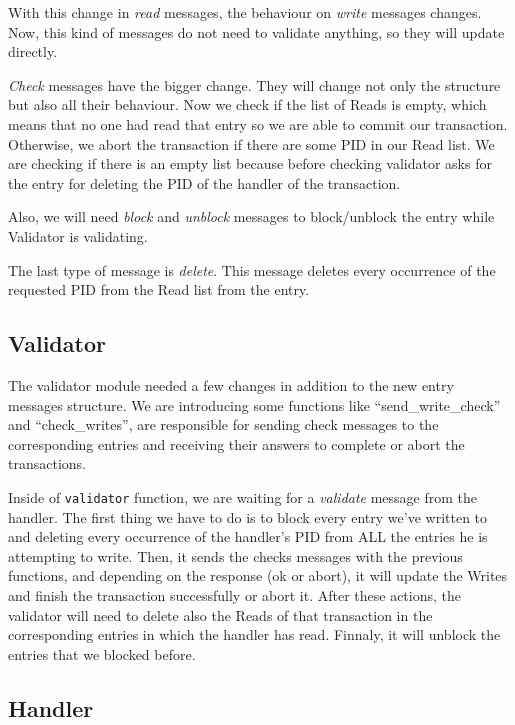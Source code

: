 \documentclass[a4paper, 10pt]{article}
\begin{document}
With this change in \textit{read} messages, the behaviour on \textit{write} messages changes. Now, this kind of messages do not need to validate anything, so they will update directly.

\textit{Check} messages have the bigger change. They will change not only the structure but also all their behaviour. Now we check if the list of Reads is empty, which means that no one had read that entry so we are able to commit our transaction. Otherwise, we abort the transaction if there are some PID in our Read list. We are checking if there is an empty list because before checking validator asks for the entry for deleting the PID of the handler of the transaction.

Also, we will need \textit{block} and \textit{unblock} messages to block/unblock the entry while Validator is validating.

The last type of message is \textit{delete}. This message deletes every occurrence of the requested PID from the Read list from the entry.

\subsection{Validator}

The validator module needed a few changes in addition to the new entry messages structure. We are introducing some functions like ``send\_write\_check'' and ``check\_writes'', are responsible for sending check messages to the corresponding entries and receiving their answers to complete or abort the transactions.

Inside of \texttt{validator} function, we are waiting for a \textit{validate} message from the handler. The first thing we have to do is to block every entry we've written to and deleting every occurrence of the handler's PID from ALL the entries he is attempting to write. Then, it sends the checks messages with the previous functions, and depending on the response (ok or abort), it will update the Writes and finish the transaction successfully or abort it. After these actions, the validator will need to delete also the Reads of that transaction in the corresponding entries in which the handler has read. Finnaly, it will unblock the entries that we blocked before.


\subsection{Handler}
\end{document}
